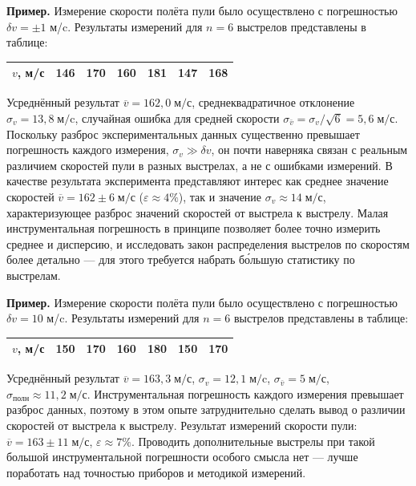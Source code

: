 {\footnotesize
\textbf{Пример.} Измерение скорости
полёта пули было осуществлено с погрешностью $\delta v=\pm1$ м/c.
Результаты измерений для $n=6$ выстрелов представлены в таблице:\par
\begin{tabular}{|c|c|c|c|c|c|c|}
\hline 
{\footnotesize{}$v$, м/с} & {\footnotesize{}146} & {\footnotesize{}170} & {\footnotesize{}160} & {\footnotesize{}181} & {\footnotesize{}147} & {\footnotesize{}168}\tabularnewline
\hline 
\end{tabular}\par
Усреднённый результат $\overline{v}=162{,}0\;\text{м/с}$,
среднеквадратичное отклонение $\sigma_{v}=13{,}8\;\text{м/c}$, случайная
ошибка для средней скорости $\sigma_{\bar{v}}=\sigma_{v}/\sqrt{6}=5{,}6\;\text{м/с}$.
Поскольку разброс экспериментальных данных существенно превышает погрешность
каждого измерения, $\sigma_{v}\gg\delta v$, он почти наверняка связан
с реальным различием скоростей пули в разных выстрелах, а не с ошибками
измерений. В качестве результата эксперимента представляют интерес
как среднее значение скоростей $\overline{v}=162\pm6\;\text{м/с}$
($\varepsilon\approx4\%$), так и значение $\sigma_{v}\approx14\;\text{м/с}$,
характеризующее разброс значений скоростей от выстрела к выстрелу.
Малая инструментальная погрешность в принципе позволяет более точно
измерить среднее и дисперсию, и исследовать закон распределения выстрелов
по скоростям более детально --- для этого требуется набрать
б\'{о}льшую статистику по выстрелам.\par
}%

{\footnotesize
\textbf{Пример.} Измерение скорости
полёта пули было осуществлено с погрешностью $\delta v=10$ м/c. Результаты
измерений для $n=6$ выстрелов представлены в таблице:\par
\begin{tabular}{|c|c|c|c|c|c|c|}
\hline 
{\footnotesize{}$v$, м/с} & {\footnotesize{}150} & {\footnotesize{}170} & {\footnotesize{}160} & {\footnotesize{}180} & {\footnotesize{}150} & {\footnotesize{}170}\tabularnewline
\hline 
\end{tabular}\par
Усреднённый результат $\overline{v}=163{,}3\;\text{м/с}$,
$\sigma_{v}=12{,}1\;\text{м/c}$, $\sigma_{\bar{v}}=5\;\text{м/с}$,
$\sigma_{\text{полн}}\approx11{,}2\;\text{м/с}$. Инструментальная
погрешность каждого измерения превышает разброс данных, поэтому в
этом опыте затруднительно сделать вывод о различии скоростей от выстрела
к выстрелу. Результат измерений скорости пули: $\overline{v}=163\pm11\;\text{м/с}$,
$\varepsilon\approx7\%$. Проводить дополнительные выстрелы при такой
большой инструментальной погрешности особого смысла нет ---
лучше поработать над точностью приборов и методикой измерений.\par
}%

